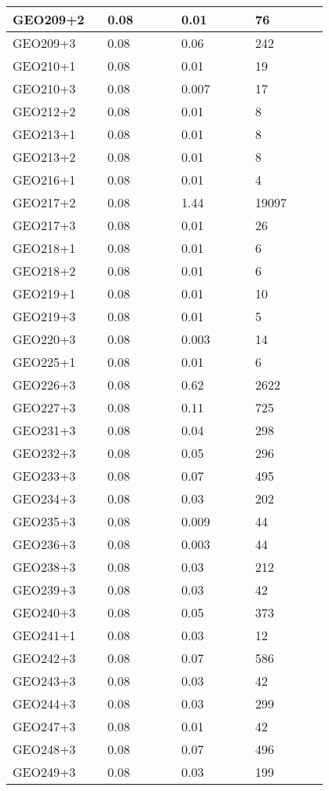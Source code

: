 \begin{longtable}[H]{|p{0.2\linewidth}|p{0.2\linewidth}|p{0.2\linewidth}|p{0.2\linewidth}|}
\hline
GEO209+2 & 0.08 & 0.01 & 76 \\
\hline
GEO209+3 & 0.08 & 0.06 & 242 \\
\hline
GEO210+1 & 0.08 & 0.01 & 19 \\
\hline
GEO210+3 & 0.08 & 0.007 & 17 \\
\hline
GEO212+2 & 0.08 & 0.01 & 8 \\
\hline
GEO213+1 & 0.08 & 0.01 & 8 \\
\hline
GEO213+2 & 0.08 & 0.01 & 8 \\
\hline
GEO216+1 & 0.08 & 0.01 & 4 \\
\hline
GEO217+2 & 0.08 & 1.44 & 19097 \\
\hline
GEO217+3 & 0.08 & 0.01 & 26 \\
\hline
GEO218+1 & 0.08 & 0.01 & 6 \\
\hline
GEO218+2 & 0.08 & 0.01 & 6 \\
\hline
GEO219+1 & 0.08 & 0.01 & 10 \\
\hline
GEO219+3 & 0.08 & 0.01 & 5 \\
\hline
GEO220+3 & 0.08 & 0.003 & 14 \\
\hline
GEO225+1 & 0.08 & 0.01 & 6 \\
\hline
GEO226+3 & 0.08 & 0.62 & 2622 \\
\hline
GEO227+3 & 0.08 & 0.11 & 725 \\
\hline
GEO231+3 & 0.08 & 0.04 & 298 \\
\hline
GEO232+3 & 0.08 & 0.05 & 296 \\
\hline
GEO233+3 & 0.08 & 0.07 & 495 \\
\hline
GEO234+3 & 0.08 & 0.03 & 202 \\
\hline
GEO235+3 & 0.08 & 0.009 & 44 \\
\hline
GEO236+3 & 0.08 & 0.003 & 44 \\
\hline
GEO238+3 & 0.08 & 0.03 & 212 \\
\hline
GEO239+3 & 0.08 & 0.03 & 42 \\
\hline
GEO240+3 & 0.08 & 0.05 & 373 \\
\hline
GEO241+1 & 0.08 & 0.03 & 12 \\
\hline
GEO242+3 & 0.08 & 0.07 & 586 \\
\hline
GEO243+3 & 0.08 & 0.03 & 42 \\
\hline 
GEO244+3 & 0.08 & 0.03 & 299 \\
\hline
GEO247+3 & 0.08 & 0.01 & 42 \\
\hline
GEO248+3 & 0.08 & 0.07 & 496 \\
\hline
GEO249+3 & 0.08 & 0.03 & 199 \\

\end{longtable}
